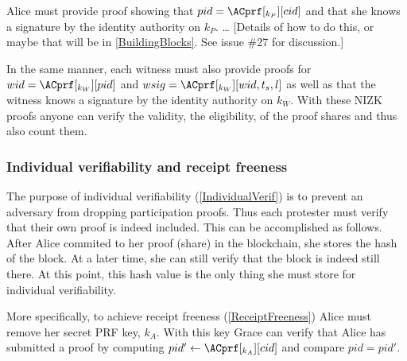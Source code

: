 Alice must provide  proof showing that \(pid = \ACprf[_{k_P}][cid]\) 
and that she knows a signature by the identity authority on \(k_P\).
\dots
[Details of how to do this, or maybe that will be in \cref{BuildingBlocks}. See 
issue \#27 for discussion.]

In the same manner, each witness must also provide  proofs for \(wid = 
  \ACprf[_{k_W}][pid]\) and \(wsig = \ACprf[_{k_W}][wid, t_s, l]\) as well as 
that the witness knows a signature by the identity authority on \(k_W\).
With these \ac{NIZK} proofs anyone can verify the validity, \ie the 
eligibility, of the proof shares and thus also count them.

\subsubsection{Individual verifiability and receipt freeness}

The purpose of individual verifiability (\cref{IndividualVerif}) is to prevent 
an adversary from dropping participation proofs.
Thus each protester must verify that their own proof is indeed included.
This can be accomplished as follows.
After Alice commited to her proof (share) in the blockchain, she stores the hash 
of the block.
At a later time, she can still verify that the block is indeed still there.
At this point, this hash value is the only thing she must store for individual 
verifiability.

More specifically, to achieve receipt freeness (\cref{ReceiptFreeness}) Alice 
must remove her secret \ac{PRF} key, \(k_A\).
With this key Grace can verify that Alice has submitted a proof by computing 
\(pid'\gets \ACprf[_{k_A}][cid]\) and compare \(pid = pid'\).
